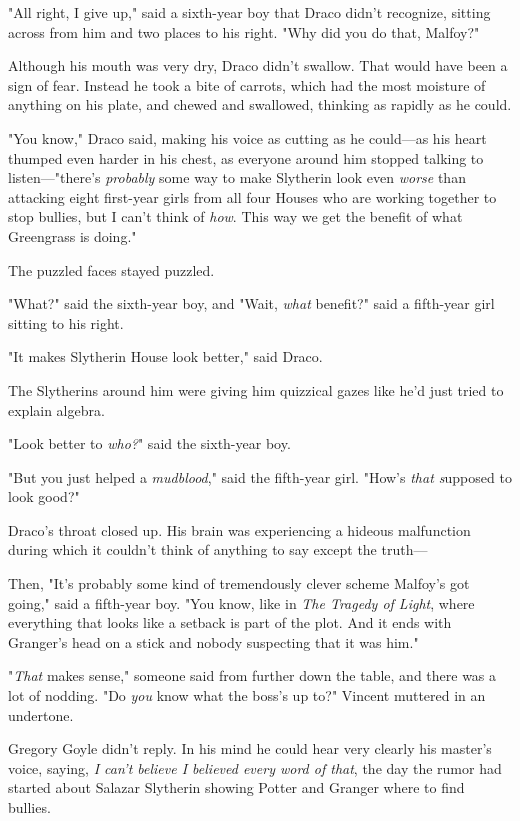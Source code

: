 "All right, I give up," said a sixth-year boy that Draco didn't recognize,
sitting across from him and two places to his right. "Why did you do that,
Malfoy?"

Although his mouth was very dry, Draco didn't swallow. That would have been a
sign of fear. Instead he took a bite of carrots, which had the most moisture of
anything on his plate, and chewed and swallowed, thinking as rapidly as he
could.

"You know," Draco said, making his voice as cutting as he could---as his heart
thumped even harder in his chest, as everyone around him stopped talking to
listen---"there's \emph{probably} some way to make Slytherin look even
\emph{worse} than attacking eight first-year girls from all four Houses who are
working together to stop bullies, but I can't think of \emph{how}. This way we
get the benefit of what Greengrass is doing."

The puzzled faces stayed puzzled.

"What?" said the sixth-year boy, and "Wait, \emph{what} benefit?" said a
fifth-year girl sitting to his right.

"It makes Slytherin House look better," said Draco.

The Slytherins around him were giving him quizzical gazes like he'd just tried
to explain algebra.

"Look better to \emph{who?}" said the sixth-year boy.

"But you just helped a \emph{mudblood}," said the fifth-year girl. "How's
\emph{that s}upposed to look good?"

Draco's throat closed up. His brain was experiencing a hideous malfunction
during which it couldn't think of anything to say except the truth---

Then, "It's probably some kind of tremendously clever scheme Malfoy's got
going," said a fifth-year boy. "You know, like in \emph{The Tragedy of Light},
where everything that looks like a setback is part of the plot. And it ends
with Granger's head on a stick and nobody suspecting that it was him."

"\emph{That} makes sense," someone said from further down the table, and there
was a lot of nodding.
\later
"Do \emph{you} know what the boss's up to?" Vincent muttered in an undertone.

Gregory Goyle didn't reply. In his mind he could hear very clearly his master's
voice, saying, \emph{I can't believe I believed every word of that}, the day
the rumor had started about Salazar Slytherin showing Potter and Granger where
to find bullies.


